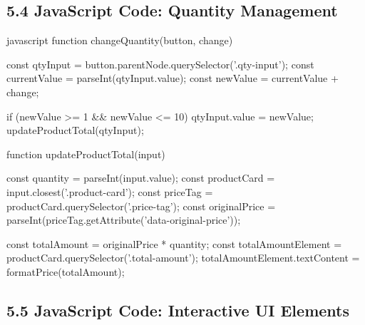 \documentclass[a4paper,12pt]{article}
\begin{document}
\subsection*{5.4 JavaScript Code: Quantity Management}
\begin{code}[fontsize=\small]{javascript}
function changeQuantity(button, change) {
    const qtyInput = button.parentNode.querySelector('.qty-input');
    const currentValue = parseInt(qtyInput.value);
    const newValue = currentValue + change;

    if (newValue >= 1 && newValue <= 10) {
        qtyInput.value = newValue;
        updateProductTotal(qtyInput);
    }
}

function updateProductTotal(input) {
    const quantity = parseInt(input.value);
    const productCard = input.closest('.product-card');
    const priceTag = productCard.querySelector('.price-tag');
    const originalPrice = parseInt(priceTag.getAttribute('data-original-price'));

    const totalAmount = originalPrice * quantity;
    const totalAmountElement = productCard.querySelector('.total-amount');
    totalAmountElement.textContent = formatPrice(totalAmount);
}
\end{code}

\subsection*{5.5 JavaScript Code: Interactive UI Elements}
\end{document}
